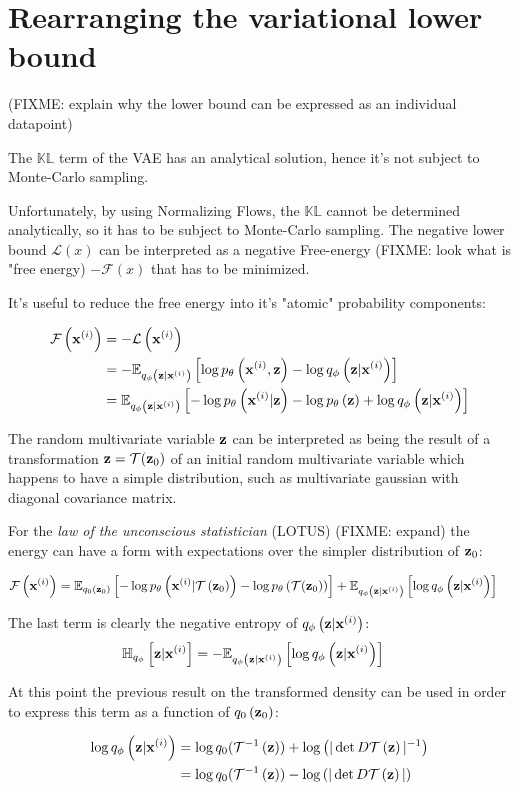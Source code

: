 \section{Rearranging the variational lower bound}

(FIXME: explain why the lower bound can be expressed as an individual datapoint)

The $\mathbb{KL}$ term of the VAE has an analytical solution, hence it's not subject
to Monte-Carlo sampling.

Unfortunately, by using Normalizing Flows, the $\mathbb{KL}$ cannot be determined
analytically, so it has to be subject to Monte-Carlo sampling.
The negative lower bound $\mathcal{L}(x)$ can be interpreted as
a negative Free-energy (FIXME: look what is "free energy) $-\mathcal{F}(x)$
that has to be minimized.

It's useful to reduce the free energy into it's "atomic" probability components:

\begin{align}
\freeenergyxi &= -\elboxi\\
    &= -\expectqphi{\logpjointi - \logqzcondi} \\
    &= \expectqphi{-\logpxicond - \logpz + \logqzcondi}
\end{align}

The random multivariate variable $\boldz$ can be interpreted as being the result
of a transformation $\boldz = \tr(\boldzzero)$ of an initial random multivariate variable 
which happens to have a simple distribution, such as multivariate gaussian 
with diagonal covariance matrix.

For the \emph{law of the unconscious statistician} (LOTUS) \cite{lotus} (FIXME: expand)
the energy can have a form with expectations over the simpler distribution of
$\boldzzero$:

\begin{align}
\freeenergyxi &= \expectqzero{- \logpxicondtr - \logptr}
+ \expectqphi{\logqzcondi}
\end{align}

The last term is clearly the negative entropy of $\qzcondi$:
\begin{align}
 \entropyqzcondi &= - \expectqphi{\logqzcondi}
\end{align}
    
At this point the previous result on the transformed density can be used in order to express this term as a function of $\qzero$:

\begin{align}
    \logqzcondi &= \log q_0(\trinv{\boldz}) + \log \left( |\detDtr{\boldz}|^{-1} \right)\\
     &= \log q_0(\trinv{\boldz}) - \log \left( |\detDtr{\boldz}| \right)
\end{align}

